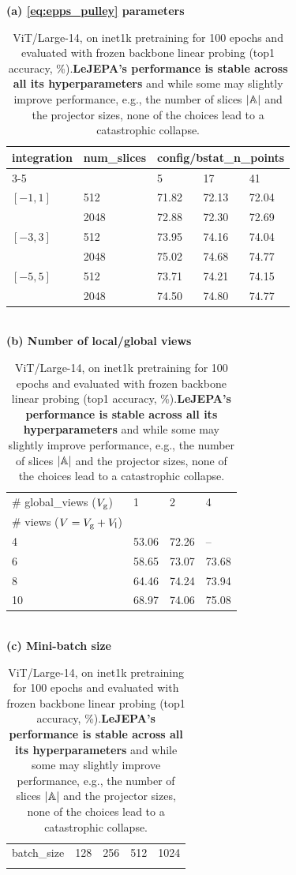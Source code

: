 \begin{table}[t!]
\centering
\caption{ViT/Large-14, on inet1k pretraining for 100 epochs and evaluated with frozen backbone linear probing (top1 accuracy, \%).{\bf LeJEPA's performance is stable across all its hyperparameters} and while some may slightly improve performance, e.g., the number of slices $|{\mathbb{A}}|$ and the projector sizes, none of the choices lead to a catastrophic collapse.}

\label{tab:ablations}
\vspace{0.5em}
\textbf{(a) \eqref{eq:epps_pulley} parameters}
\vspace{0.5em}
\begin{tabular}{lllll}
\toprule
integration & num\_slices & \multicolumn{3}{c}{config/bstat\_n\_points} \\
\cmidrule(lr){3-5}
 &  & 5 & 17 & 41 \\
\midrule
$[-1,1]$ & 512 & 71.82 & 72.13 & 72.04 \\
  & 2048 & 72.88 & 72.30 & 72.69 \\
$[-3,3]$ & 512 & 73.95 & 74.16 & 74.04 \\
  & 2048 & 75.02 & 74.68 & 74.77 \\
$[-5,5]$ & 512 & 73.71 & 74.21 & 74.15 \\
  & 2048 & 74.50 & 74.80 & 74.77 \\
\bottomrule
\end{tabular}
\\
\vspace{0.5em}
\textbf{(b) Number of local/global views}
\vspace{0.5em}
\begin{tabular}{llll}
\toprule
\# global\_views ($V_{\rm g}$) & 1 & 2 & 4 \\
\# views ($V=V_{\rm g}+V_{\rm l}$) &  &  &  \\
\midrule
4 & 53.06 & 72.26 & – \\
6 & 58.65 & 73.07 & 73.68 \\
8 & 64.46 & 74.24 & 73.94 \\
10 & 68.97 & 74.06 & 75.08 \\
\bottomrule
\end{tabular}
\\
\vspace{0.5em}
\textbf{(c) Mini-batch size}
\vspace{0.5em}
\begin{tabular}{lllll}
\toprule
batch\_size & 128 & 256 & 512 & 1024 \\
&  &  &  &  \\

\end{tabular}
\end{table}
